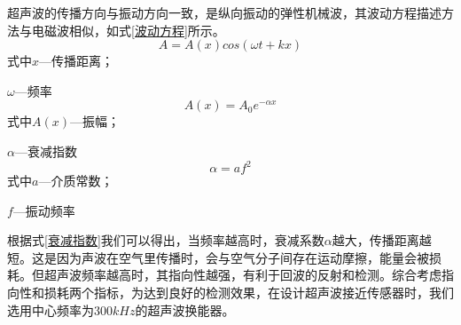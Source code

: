       超声波的传播方向与振动方向一致，是纵向振动的弹性机械波，其波动方程描述方法与电磁波相似，如式\ref{波动方程}所示。
    \begin{equation}
    	A=A(x)cos(\omega t+kx)
    	\label{波动方程}
    \end{equation}
	式中\quad$x$---传播距离；\par
	\quad$\omega$---频率
	\begin{equation}
		A(x)=A_0 e^{-\alpha x}
		\label{振幅方程}
	\end{equation}
	式中\quad$A(x)$---振幅；\par
		\quad$\alpha$---衰减指数
	\begin{equation}
		\alpha=a f^2
		\label{衰减指数}
	\end{equation}
	式中\quad $a$---介质常数；\par
	   \quad $f$---振动频率\par
    根据式\ref{衰减指数}我们可以得出，当频率越高时，衰减系数$\alpha$越大，传播距离越短。这是因为声波在空气里传播时，会与空气分子间存在运动摩擦，能量会被损耗。但超声波频率越高时，其指向性越强，有利于回波的反射和检测。综合考虑指向性和损耗两个指标，为达到良好的检测效果，在设计超声波接近传感器时，我们选用中心频率为$300kHz$的超声波换能器。
